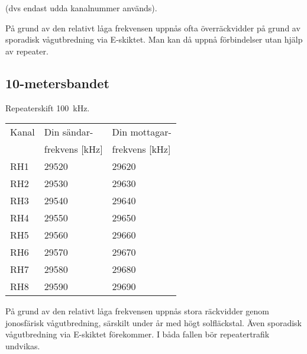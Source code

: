 (dvs endast udda kanalnummer används).

På grund av den relativt låga frekvensen uppnås ofta överräckvidder på grund av
sporadisk vågutbredning via E-skiktet.
Man kan då uppnå förbindelser utan hjälp av repeater.

\subsection{10-metersbandet}
Repeaterskift 100~kHz.

\begin{tabular}{ l | l | l }
  Kanal & Din sändar- & Din mottagar- \\
        & frekvens [kHz] & frekvens [kHz] \\
  \hline
  RH1 & 29520 & 29620 \\
  RH2 & 29530 & 29630 \\
  RH3 & 29540 & 29640 \\
  RH4 & 29550 & 29650 \\
  RH5 & 29560 & 29660 \\
  RH6 & 29570 & 29670 \\
  RH7 & 29580 & 29680 \\
  RH8 & 29590 & 29690 \\
\end{tabular}

På grund av den relativt låga frekvensen uppnås stora räckvidder genom
jonosfärisk vågutbredning, särskilt under år med högt solfläckstal.
Även sporadisk vågutbredning via E-skiktet förekommer.
I båda fallen bör repeatertrafik undvikas.
